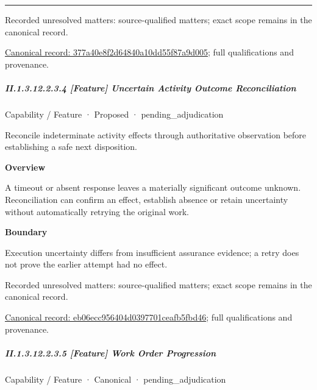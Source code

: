 \medskip\hrule\medskip

{\small Recorded unresolved matters: source-qualified matters; exact scope remains in the canonical record.}\par
{\footnotesize \href{../../../../continuum/strategy/capability/feature/377a40e8f2d64840a10dd55f87a9d005.md}{Canonical record: 377a40e8f2d64840a10dd55f87a9d005}; full qualifications and provenance.}\par
\subparagraph*{II.1.3.12.2.3.4 [Feature] Uncertain Activity Outcome Reconciliation}
\label{navigation:II.1.3.12.2.3.4}

\label{element:eb06ecc956404d0397701ceafb5fbd46}
{\small Capability / Feature · Proposed · pending\_adjudication}\par

Reconcile indeterminate activity effects through authoritative observation before establishing a safe next disposition.



\textbf{Overview}



A timeout or absent response leaves a materially significant outcome unknown. Reconciliation can confirm an effect, establish absence or retain uncertainty without automatically retrying the original work.



\textbf{Boundary}



Execution uncertainty differs from insufficient assurance evidence; a retry does not prove the earlier attempt had no effect.


{\small Recorded unresolved matters: source-qualified matters; exact scope remains in the canonical record.}\par
{\footnotesize \href{../../../../continuum/strategy/capability/feature/eb06ecc956404d0397701ceafb5fbd46.md}{Canonical record: eb06ecc956404d0397701ceafb5fbd46}; full qualifications and provenance.}\par
\subparagraph*{II.1.3.12.2.3.5 [Feature] Work Order Progression}
\label{navigation:II.1.3.12.2.3.5}

\label{element:5ca494e85869419c867618fd9648d03a}
{\small Capability / Feature · Canonical · pending\_adjudication}\par


